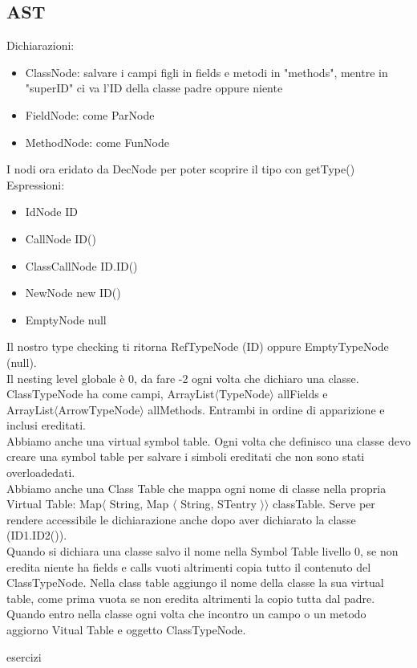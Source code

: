 \documentclass[12pt]{article}
\begin{document}
\subsection{AST}
Dichiarazioni:
\begin{itemize}
    \item ClassNode: salvare i campi figli in fields e metodi in "methods", mentre in "superID" ci va l'ID della classe padre oppure niente
    \item FieldNode: come ParNode
    \item MethodNode: come FunNode
\end{itemize}
I nodi ora eridato da DecNode per poter scoprire il tipo con getType()
\\ Espressioni:
\begin{itemize}
    \item IdNode        ID 
    \item CallNode      ID()
    \item ClassCallNode ID.ID()
    \item NewNode new   ID()
    \item EmptyNode     null
\end{itemize}
Il nostro type checking ti ritorna RefTypeNode (ID) oppure EmptyTypeNode (null).
\\ Il nesting level globale è 0, da fare -2 ogni volta che dichiaro una classe. ClassTypeNode ha come campi, ArrayList$\langle$TypeNode$\rangle$ allFields e \\ ArrayList$\langle$ArrowTypeNode$\rangle$ allMethods. Entrambi in ordine di apparizione e inclusi ereditati.
\\ Abbiamo anche una virtual symbol table. Ogni volta che definisco una classe devo creare una symbol table per salvare i simboli ereditati che non sono stati overloadedati.
\\ Abbiamo anche una Class Table che mappa ogni nome di classe nella propria Virtual Table: Map$\langle$ String, Map $\langle$ String, STentry $\rangle\rangle$ classTable. Serve per rendere accessibile le dichiarazione anche dopo aver dichiarato la classe (ID1.ID2()).
\\ Quando si dichiara una classe salvo il nome nella Symbol Table livello 0, se non eredita niente ha fields e calls vuoti altrimenti copia tutto il contenuto del ClassTypeNode. Nella class table aggiungo il nome della classe la sua virtual table, come prima vuota se non eredita altrimenti la copio tutta dal padre. 
\\ Quando entro nella classe ogni volta che incontro un campo o un metodo aggiorno Vitual Table e oggetto ClassTypeNode.

\newpage
{esercizi}
\end{document}

